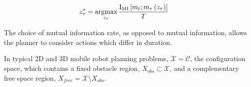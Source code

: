 \documentclass[conference]{IEEEtran}
\begin{document}
\begin{align} \begin{split}
  z_{\tau}^{*}
  &=
  \argmax_{z_{\tau}}
  \frac{\text{I}_{\text{MI}}\left[m_{t}; m_{\tau}\left(z_{\tau}\right) \right]}
  {T}
\end{split} \end{align}

The choice of mutual information rate, as opposed to mutual information, allows the planner to consider actions which differ in duration.

In typical 2D and 3D mobile robot planning problems, $\mathcal{X} = \mathcal{C}$, the configuration space, which contains a fixed obstacle region, $X_{obs} \subset \mathcal{X}$, and a complementary free space region, $X_{free} = \mathcal{X} \setminus X_{obs}$.
\fi
\end{document}
